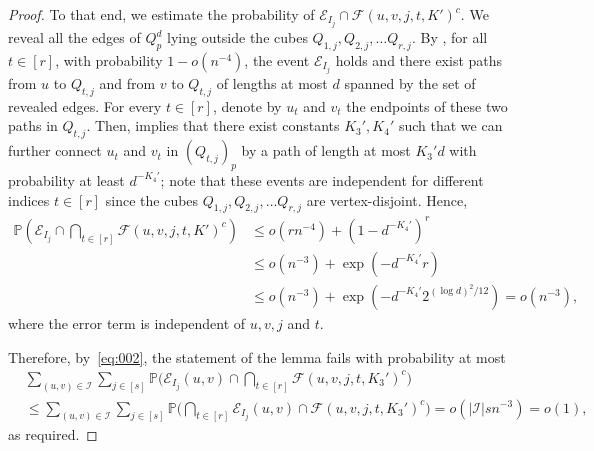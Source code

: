 \documentclass[10pt,a4paper]{amsart}
\newcommand{\cE}{\mathcal{E}}
\newcommand{\cF}{\mathcal{F}}
\newcommand{\cI}{\mathcal{I}}
\begin{document}
\begin{proof}
To that end, we estimate the probability of $\cE_{I_j}\cap \cF(u,v,j,t,K')^c$. 
We reveal all the edges of $Q_p^d$ lying outside the cubes $Q_{1,j},Q_{2,j},\ldots Q_{r,j}$. 
By , for all $t\in [r]$,
with probability $1-o(n^{-4})$, the event $\cE_{I_j}$ holds and there exist paths from $u$ to $Q_{t,j}$ and from $v$ to $Q_{t,j}$ of lengths at most $d$ spanned by the set of revealed edges.
For every $t\in [r]$, denote by $u_t$ and $v_t$ the endpoints of these two paths in $Q_{t,j}$.
Then,  implies that there exist constants $K_3',K_4'$ such that we can further connect $u_t$ and $v_t$ in $(Q_{t,j})_p$ by a path of length at most $K_3'd$ with probability at least $d^{-K_4'}$; 
note that these events are independent for different indices $t\in [r]$ since the cubes $Q_{1,j},Q_{2,j},\ldots Q_{r,j}$ are vertex-disjoint. 
Hence,  
\begin{align*}
\mathbb{P}\left(\cE_{I_j}\cap \bigcap_{t\in[r]}\cF(u,v,j,t,K')^c\right)&\le o(rn^{-4})+\left(1-d^{-K_4'}\right)^{r}\\
&\leq  o(n^{-3})+\exp(-d^{-K_4'}r)\\&\le o(n^{-3})+\exp\left(-d^{-K_4'}2^{(\log d)^2/12}\right)=o(n^{-3}),
\end{align*}
where the error term is independent of $u,v,j$ and $t$.

Therefore, by~\eqref{eq:002}, the statement of the lemma fails with probability at most
\[\begin{split}
&\sum_{(u,v)\in \cI} \sum_{j\in [s]} \mathbb P\bigg(\cE_{I_j}(u,v)\cap \bigcap_{t\in [r]} \cF(u,v,j,t,K_3')^c\bigg)\\
&\le \sum_{(u,v)\in \cI} \sum_{j\in [s]} \mathbb P\bigg( \bigcap_{t\in [r]}\cE_{I_j}(u,v)\cap \cF(u,v,j,t,K_3')^c\bigg)=o(|\cI|sn^{-3})=o(1),
\end{split}\]
as required.
\end{proof}
\end{document}
